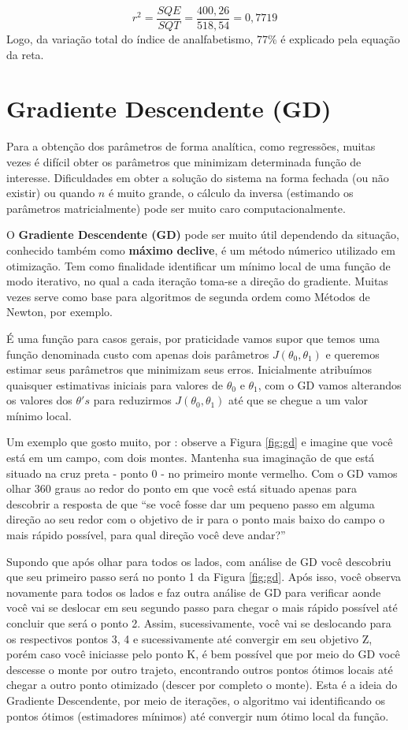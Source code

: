 \documentclass[
  openany]{book}
\begin{document}
\[r^2=\frac{SQE}{SQT}=\frac{400,26}{518,54}=0,7719\]
Logo, da variação total do índice de analfabetismo, 77\% é explicado pela equação da reta.

\hypertarget{GD}{%
\section{Gradiente Descendente (GD)}\label{GD}}

Para a obtenção dos parâmetros de forma analítica, como regressões, muitas vezes é difícil obter os parâmetros que minimizam determinada função de interesse. Dificuldades em obter a solução do sistema na forma fechada (ou não existir) ou quando \(n\) é muito grande, o cálculo da inversa (estimando os parâmetros matricialmente) pode ser muito caro computacionalmente.

O \textbf{Gradiente Descendente (GD)} pode ser muito útil dependendo da situação, conhecido também como \textbf{máximo declive}, é um método númerico utilizado em otimização. Tem como finalidade identificar um mínimo local de uma função de modo iterativo, no qual a cada iteração toma-se a direção do gradiente. Muitas vezes serve como base para algoritmos de segunda ordem como Métodos de Newton, por exemplo.

É uma função para casos gerais, por praticidade vamos supor que temos uma função denominada custo com apenas dois parâmetros \(J(\theta_0,\theta_1)\) e queremos estimar seus parâmetros que minimizam seus erros. Inicialmente atribuímos quaisquer estimativas iniciais para valores de \(\theta_0\) e \(\theta_1\), com o GD vamos alterandos os valores dos \(\theta's\) para reduzirmos \(J(\theta_0,\theta_1)\) até que se chegue a um valor mínimo local.

Um exemplo que gosto muito, por \citet{andrewcoursera}: observe a Figura \ref{fig:gd} e imagine que você está em um campo, com dois montes. Mantenha sua imaginação de que está situado na cruz preta - ponto 0 - no primeiro monte vermelho. Com o GD vamos olhar 360 graus ao redor do ponto em que você está situado apenas para descobrir a resposta de que ``se você fosse dar um pequeno passo em alguma direção ao seu redor com o objetivo de ir para o ponto mais baixo do campo o mais rápido possível, para qual direção você deve andar?''

Supondo que após olhar para todos os lados, com análise de GD você descobriu que seu primeiro passo será no ponto 1 da Figura \ref{fig:gd}. Após isso, você observa novamente para todos os lados e faz outra análise de GD para verificar aonde você vai se deslocar em seu segundo passo para chegar o mais rápido possível até concluir que será o ponto 2. Assim, sucessivamente, você vai se deslocando para os respectivos pontos 3, 4 e sucessivamente até convergir em seu objetivo Z, porém caso você iniciasse pelo ponto K, é bem possível que por meio do GD você descesse o monte por outro trajeto, encontrando outros pontos ótimos locais até chegar a outro ponto otimizado (descer por completo o monte). Esta é a ideia do Gradiente Descendente, por meio de iterações, o algoritmo vai identificando os pontos ótimos (estimadores mínimos) até convergir num ótimo local da função.
\end{document}
